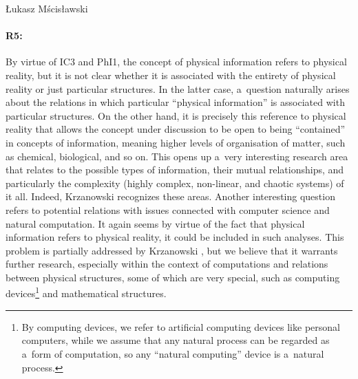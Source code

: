 \begin{artengenv}{Łukasz Mścisławski}
\paragraph{R5:} By virtue of IC3 and PhI1, the concept of physical information refers to physical reality, but it is not clear whether it is associated with the entirety of physical reality or just particular structures. In the latter case, a~question naturally arises about the relations in which particular ``physical information'' is associated with particular structures. On the other hand, it is precisely this reference to physical reality that allows the concept under discussion to be open to being ``contained'' in concepts of information, meaning higher levels of organisation of matter, such as chemical, biological, and so on. This opens up a~very interesting research area that relates to the possible types of information, their mutual relationships, and particularly the complexity (highly complex, non-linear, and chaotic systems) of it all. Indeed, Krzanowski
\parencite*[][p.13]{krzanowski_what_2020} %
 recognizes these areas. Another interesting question refers to potential relations with issues connected with computer science and natural computation. It again seems by virtue of the fact that physical information refers to physical reality, it could be included in such analyses. This problem is partially addressed by Krzanowski 
\parencite*[][]{krzanowski_ontological_2022}, %
 but we believe that it warrants further research, especially within the context of computations and relations between physical structures, some of which are very special, such as computing devices\footnote{By computing devices, we refer to artificial computing devices like personal computers, while we assume that any natural process can be regarded as a~form of computation, so any ``natural computing'' device is a~natural process.} and mathematical structures.


\end{artengenv}
